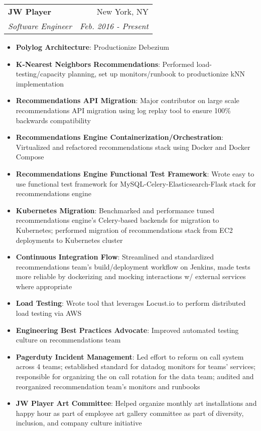 \documentclass[letterpaper,11pt]{article}
\makeatletter
\newcommand{\resumeItem}[2]{
  \item\small{
    \textbf{#1}{: #2 \vspace{-2pt}}
  }
}
\newcommand{\resumeSubheading}[4]{
  \vspace{-1pt}\item
    \begin{tabular*}{0.97\textwidth}{l@{\extracolsep{\fill}}r}
      \textbf{#1} & #2 \\
      \textit{\small#3} & \textit{\small #4} \\
    \end{tabular*}\vspace{-5pt}
}
\newcommand{\resumeItemListStart}{\begin{itemize}}
\newcommand{\resumeItemListEnd}{\end{itemize}\vspace{-5pt}}
\makeatother
\begin{document}
    \resumeSubheading
      {JW Player}{New York, NY}
      {Software Engineer}{Feb. 2016 - Present}
      \resumeItemListStart
        \resumeItem{Polylog Architecture}
          {Productionize Debezium}
        \resumeItem{K-Nearest Neighbors Recommendations}
          {Performed load-testing/capacity planning, set up monitors/runbook to productionize kNN implementation}
        \resumeItem{Recommendations API Migration}
          {Major contributor on large scale recommendations API migration using log replay tool to ensure 100\% backwards compatibility}
        \resumeItem{Recommendations Engine Containerization/Orchestration}
          {Virtualized and refactored recommendations stack using Docker and Docker Compose}
        \resumeItem{Recommendations Engine Functional Test Framework}
          {Wrote easy to use functional test framework for MySQL-Celery-Elasticsearch-Flask stack for recommendations engine}
        \resumeItem{Kubernetes Migration}
          {Benchmarked and performance tuned recommendations engine's Celery-based backends for migration to Kubernetes; performed migration of recommendations stack from EC2 deployments to Kubernetes cluster}
        \resumeItem{Continuous Integration Flow}
          {Streamlined and standardized recommendations team's build/deployment workflow on Jenkins, made tests more reliable by dockerizing and mocking interactions w/ external services where appropriate}
        \resumeItem{Load Testing}
          {Wrote tool that leverages Locust.io to perform distributed load testing via AWS}
        \resumeItem{Engineering Best Practices Advocate}
          {Improved automated testing culture on recommendations team}
        \resumeItem{Pagerduty Incident Management}
          {Led effort to reform on call system across 4 teams; established standard for datadog monitors for teams' services; responsible for organizing the on call rotation for the data team; audited and reorganized recommendation team's monitors and runbooks}
        \resumeItem{JW Player Art Committee}
          {Helped organize monthly art installations and happy hour as part of employee art gallery committee as part of diversity, inclusion, and company culture initiative}
      \resumeItemListEnd
\end{document}
